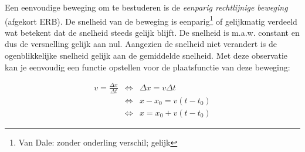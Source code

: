 \documentclass{ximera}
\begin{document}
	\author{Bart Lambregs}
    \xmsource\xmuitleg




Een eenvoudige beweging om te bestuderen is de \emph{eenparig rechtlijnige beweging} (afgekort ERB). 
De snelheid van de beweging is eenparig\footnote{Van Dale: zonder onderling verschil; gelijk} of gelijkmatig verdeeld wat betekent dat de snelheid steeds gelijk blijft. 
De snelheid is m.a.w. constant en dus de versnelling gelijk aan nul. 
Aangezien de snelheid niet verandert is de ogenblikkelijke snelheid gelijk aan de gemiddelde snelheid. 
Met deze observatie kan je eenvoudig een functie opstellen voor de plaatsfunctie van deze beweging:

\[
\begin{array}{rcl}

v=\frac{\Delta x}{\Delta t} & \Leftrightarrow & \Delta x=v\Delta t \\
&\Leftrightarrow & x-x_0=v(t-t_0) \\
&\Leftrightarrow & x=x_0+v(t-t_0)

\end{array}
\]
\end{document}
